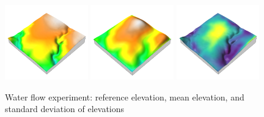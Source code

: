 \documentclass[prodmode,acmtochi]{acmsmall} %
\begin{document}
\begin{figure}[h!]
\begin{center}
		\includegraphics[width=0.32\textwidth]{images/render_3d/dem_5.png}
		\includegraphics[width=0.32\textwidth]{images/render_3d/mean_dem_5.png}
		\includegraphics[width=0.32\textwidth]{images/render_3d/stdev_dem_5.png}
	\caption{Water flow experiment: reference elevation, mean elevation, and standard deviation of elevations}
	\label{fig:}
\end{center}
\end{figure}
\end{document}
